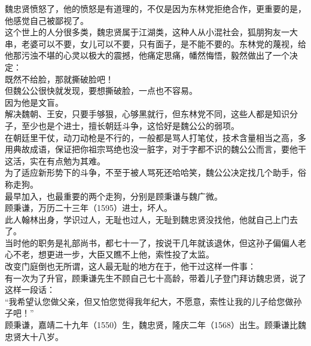 \begin{multicols}{\theparacolNo}
魏忠贤愤怒了，他的愤怒是有道理的，不仅是因为东林党拒绝合作，更重要的是，他感觉自己被鄙视了。\\

这个世上的人分很多类，魏忠贤属于江湖类，这种人从小混社会，狐朋狗友一大串，老婆可以不要，女儿可以不要，只有面子，是不能不要的。东林党的蔑视，给他那污浊不堪的心灵以极大的震撼，他痛定思痛，幡然悔悟，毅然做出了一个决定：\\

既然不给脸，那就撕破脸吧！\\

但魏公公很快就发现，要想撕破脸，一点也不容易。\\

因为他是文盲。\\

解决魏朝、王安，只要手够狠，心够黑就行，但东林党不同，这些人都是知识分子，至少也是个进士，擅长朝廷斗争，这恰好是魏公公的弱项。\\

在朝廷里干仗，动刀动枪是不行的，一般都是骂人打笔仗，技术含量相当之高，多用典故成语，保证把你祖宗骂绝也没一脏字，对于字都不识的魏公公而言，要他干这活，实在有点勉为其难。\\

为了适应新形势下的斗争，不至于被人骂死还哈哈笑，魏公公决定找几个助手，俗称走狗。\\

最早加入，也最重要的两个走狗，分别是顾秉谦与魏广微。\\

顾秉谦，万历二十三年（1595）进士，坏人。\\

此人翰林出身，学识过人，无耻也过人，无耻到魏忠贤没找他，他就自己上门去了。\\

当时他的职务是礼部尚书，都七十一了，按说干几年就该退休，但这孙子偏偏人老心不老，想更进一步，大臣又瞧不上他，索性投了太监。\\

改变门庭倒也无所谓，这人最无耻的地方在于，他干过这样一件事：\\

有一次为了升官，顾秉谦先生不顾自己七十高龄，带着儿子登门拜访魏忠贤，说了这样一段话：\\

“我希望认您做父亲，但又怕您觉得我年纪大，不愿意，索性让我的儿子给您做孙子吧！”\\

顾秉谦，嘉靖二十九年（1550）生，魏忠贤，隆庆二年（1568）出生。顾秉谦比魏忠贤大十八岁。\\


\end{multicols}
